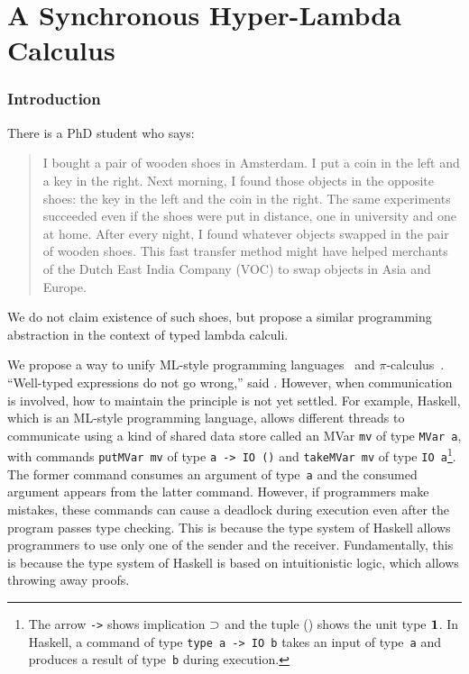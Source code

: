 \chapter{A Synchronous Hyper-Lambda Calculus}
\label{ch:exchange}

\subsection{Introduction}

There is a PhD student who says:
\begin{quotation}
 I bought a pair of wooden shoes in Amsterdam.  I put
 a coin in the left and a key in the right.
 Next morning, I found those objects in the opposite shoes:
 the key in the left and the coin in the right.
 The same experiments succeeded even if the shoes were put in distance, one in
 university and one at home.  After every night, I found whatever objects swapped in
 the pair of wooden shoes.
 This fast transfer method might have helped merchants of
 the Dutch East India Company (VOC) to swap objects in Asia and Europe.
\end{quotation}
We do not claim existence of such shoes, but propose
a similar programming abstraction in the context of typed lambda calculi.

We propose a way to unify ML-style programming
languages~\citep{milner1997definition, marlow2010haskell} and
$\pi$-calculus~\citep{milner1999communicating}.
``Well-typed expressions do not go wrong,'' said \citet{milner1978}.
However, when communication is involved, how to maintain the principle
is not yet settled.
For example, Haskell, which is an ML-style programming language,
allows different threads to communicate using a kind of shared data
store called an MVar \texttt{mv} of
type \texttt{MVar
a}, with commands
\texttt{putMVar mv} of type \texttt{a -> IO ()} and \texttt{takeMVar mv}
of type \texttt{IO
a}\footnote{The arrow \texttt{->} shows implication $\supset$ and the tuple
() shows the unit type $\mathbf{1}$.  In Haskell, a command of type
\texttt{type a -> IO b} takes an input of type~\texttt{a} and produces a
result of type~\texttt{b} during execution.}.
The former command consumes an argument of type~\texttt{a} and
the consumed argument appears from the latter command.
However, if programmers make mistakes, these commands can
cause a deadlock during execution even after the program passes type
checking.
This is because the type system of Haskell allows programmers to
use only one of the sender and the receiver.
Fundamentally, this is because the type system of Haskell
is based on intuitionistic logic, which allows throwing away proofs.


